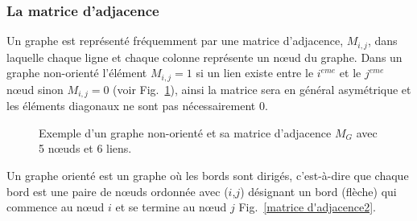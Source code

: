 \subsubsection{La matrice d’adjacence}
Un graphe est représenté fréquemment par une matrice d'adjacence, $M_{i,j}$, dans laquelle chaque ligne et
chaque colonne représente un nœud du graphe. Dans un graphe non-orienté l'élément $M_{i,j}=1$ si un lien existe
entre le $i^{eme}$ et le $j^{eme}$ nœud sinon $M_{i,j}=0$  (voir Fig.~\ref{matrice d'adjacence}), ainsi la matrice 
sera en général asymétrique et les éléments diagonaux ne sont pas nécessairement $0$.
\begin{figure}[h]
	\centering
	\caption{Exemple d'un graphe non-orienté et sa matrice d'adjacence $M_G$ avec 5 nœuds et 6 liens.}
	\label{matrice d'adjacence}
\end{figure}  

Un graphe orienté est un graphe où les bords sont dirigés, c'est-à-dire que chaque bord est une paire de nœuds 
ordonnée avec ($i$,$j$) désignant un bord (flèche) qui commence au nœud $i$ et se termine au nœud $j$ 
Fig.~\ref{matrice d'adjacence2}. 


